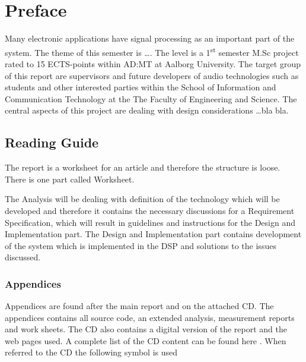 \chapter*{Preface}
Many electronic applications have signal processing as an important part of the system. The theme of this semester is \ldots. The level is a 1\textsuperscript{st} semester M.Sc project rated to 15 ECTS-points within AD:MT at Aalborg University.
The target group of this report are supervisors and future developers of audio technologies such as students and other interested parties within the School of Information and Communication Technology at the The Faculty of Engineering and Science.
The central aspects of this project are dealing with design considerations \ldots bla bla.
\section*{Reading Guide}
The report is a worksheet for an article and therefore the structure is loose. There is one part called Worksheet.
%
% 

The Analysis will be dealing with definition of the technology which will be developed and therefore it contains the necessary discussions for a Requirement Specification, which will result in guidelines and instructions for the Design and Implementation part. The Design and Implementation part contains development of the system which is implemented in the DSP and solutions to the issues discussed. %

\subsection*{Appendices}
Appendices are found after the main report  and on the attached CD. The appendices contains all source code, an extended analysis, measurement reports and work sheets. The CD also contains a digital version of the report and the web pages used. A complete list of the CD content can be found here . When referred to the CD the following symbol is used  

